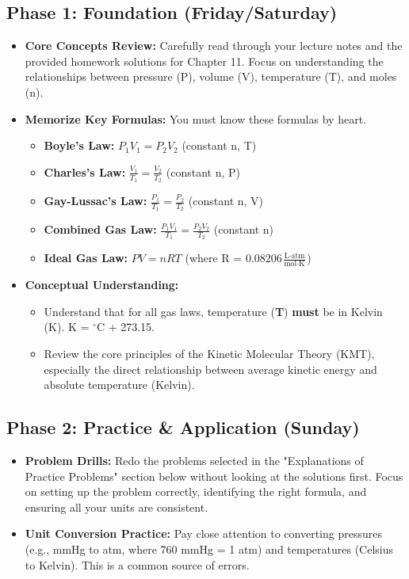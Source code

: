 \documentclass{article}
\begin{document}
\subsection{Phase 1: Foundation (Friday/Saturday)}
\begin{itemize}
    \item \textbf{Core Concepts Review:} Carefully read through your lecture notes and the provided homework solutions for Chapter 11. Focus on understanding the relationships between pressure (P), volume (V), temperature (T), and moles (n).
    \item \textbf{Memorize Key Formulas:} You must know these formulas by heart.
        \begin{itemize}
            \item \textbf{Boyle's Law:} $P_1V_1 = P_2V_2$ (constant n, T)
            \item \textbf{Charles's Law:} $\frac{V_1}{T_1} = \frac{V_2}{T_2}$ (constant n, P)
            \item \textbf{Gay-Lussac's Law:} $\frac{P_1}{T_1} = \frac{P_2}{T_2}$ (constant n, V)
            \item \textbf{Combined Gas Law:} $\frac{P_1V_1}{T_1} = \frac{P_2V_2}{T_2}$ (constant n)
            \item \textbf{Ideal Gas Law:} $PV = nRT$ (where R = $0.08206 \frac{\text{L} \cdot \text{atm}}{\text{mol} \cdot \text{K}}$)
        \end{itemize}
    \item \textbf{Conceptual Understanding:}
        \begin{itemize}
            \item Understand that for all gas laws, temperature (\textbf{T}) \textbf{must} be in Kelvin (K). K = $^{\circ}$C + 273.15.
            \item Review the core principles of the Kinetic Molecular Theory (KMT), especially the direct relationship between average kinetic energy and absolute temperature (Kelvin).
        \end{itemize}
\end{itemize}

\subsection{Phase 2: Practice \& Application (Sunday)}
\begin{itemize}
    \item \textbf{Problem Drills:} Redo the problems selected in the "Explanations of Practice Problems" section below without looking at the solutions first. Focus on setting up the problem correctly, identifying the right formula, and ensuring all your units are consistent.
    \item \textbf{Unit Conversion Practice:} Pay close attention to converting pressures (e.g., mmHg to atm, where 760 mmHg = 1 atm) and temperatures (Celsius to Kelvin). This is a common source of errors.
\end{itemize}
\end{document}
